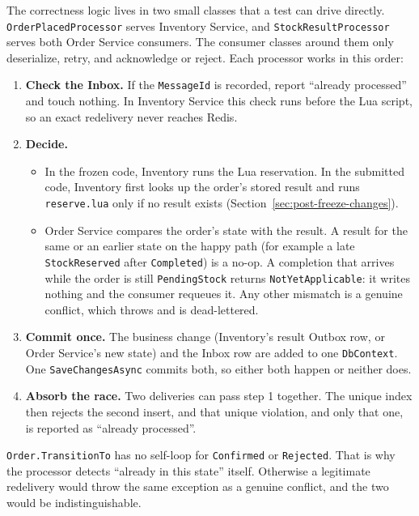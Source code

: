 \documentclass[a4paper]{report}
\begin{document}
The correctness logic lives in two small classes that a test can drive
directly. \texttt{OrderPlacedProcessor} serves Inventory Service, and
\texttt{StockResultProcessor} serves both Order Service consumers. The
consumer classes around them only deserialize, retry, and acknowledge or
reject. Each processor works in this order:
\begin{enumerate}
  \item \textbf{Check the Inbox.} If the \texttt{MessageId} is recorded,
    report ``already processed'' and touch nothing. In Inventory Service
    this check runs before the Lua script, so an exact redelivery never
    reaches Redis.
  \item \textbf{Decide.}
    \begin{itemize}
      \item In the frozen code, Inventory runs the Lua reservation. In the
        submitted code, Inventory first looks up the order's stored result
        and runs \texttt{reserve.lua} only if no result exists
        (Section~\ref{sec:post-freeze-changes}).
      \item Order Service compares the order's state with the result. A
        result for the same or an earlier state on the happy path (for
        example a late \texttt{StockReserved} after \texttt{Completed}) is a
        no-op. A completion that arrives while the order is still
        \texttt{PendingStock} returns \texttt{NotYetApplicable}: it writes
        nothing and the consumer requeues it. Any other mismatch is a
        genuine conflict, which throws and is dead-lettered.
    \end{itemize}
  \item \textbf{Commit once.} The business change (Inventory's result
    Outbox row, or Order Service's new state) and the Inbox row are added
    to one \texttt{DbContext}. One \texttt{SaveChangesAsync} commits both,
    so either both happen or neither does.
  \item \textbf{Absorb the race.} Two deliveries can pass step 1 together.
    The unique index then rejects the second insert, and that unique
    violation, and only that one, is reported as ``already processed''.
\end{enumerate}

\texttt{Order.TransitionTo} has no self-loop for \texttt{Confirmed} or
\texttt{Rejected}. That is why the processor detects ``already in this
state'' itself. Otherwise a legitimate redelivery would throw the same
exception as a genuine conflict, and the two would be indistinguishable.
\end{document}
